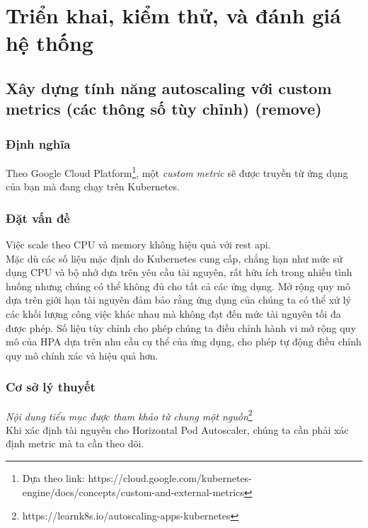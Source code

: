 \chapter{Triển khai, kiểm thử, và đánh giá hệ thống}
\section{Xây dựng tính năng autoscaling với custom metrics (các thông số tùy chỉnh) (remove)}

\subsection{Định nghĩa}
\noindent Theo Google Cloud Platform\footnote{Dựa theo link: https://cloud.google.com/kubernetes-engine/docs/concepts/custom-and-external-metrics}, một \textit{custom metric} sẽ được truyền từ ứng dụng của bạn mà đang chạy trên Kubernetes.
\subsection{Đặt vấn đề}
\noindent Việc scale theo CPU và memory không hiệu quả với rest api.\\
\noindent Mặc dù các số liệu mặc định do Kubernetes cung cấp, chẳng hạn như mức sử dụng CPU và bộ nhớ dựa trên yêu cầu tài nguyên, rất hữu ích trong nhiều tình huống nhưng chúng có thể không đủ cho tất cả các ứng dụng. Mở rộng quy mô dựa trên giới hạn tài nguyên đảm bảo rằng ứng dụng của chúng ta có thể xử lý các khối lượng công việc khác nhau mà không đạt đến mức tài nguyên tối đa được phép. Số liệu tùy chỉnh cho phép chúng ta điều chỉnh hành vi mở rộng quy mô của HPA dựa trên nhu cầu cụ thể của ứng dụng, cho phép tự động điều chỉnh quy mô chính xác và hiệu quả hơn.
\subsection{Cơ sở lý thuyết}
\textit{Nội dung tiểu mục được tham khảo từ chung một nguồn}\footnote{https://learnk8s.io/autoscaling-apps-kubernetes}\\[0.5cm]
Khi xác định tài nguyên cho Horizontal Pod Autoscaler, chúng ta cần phải xác định metric mà ta cần theo dõi.

